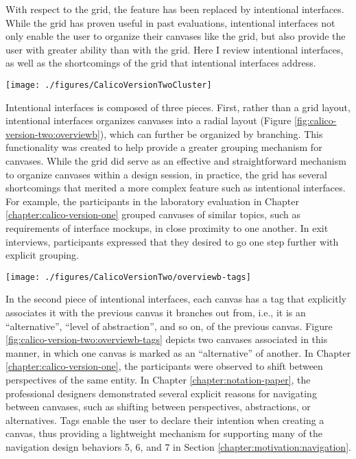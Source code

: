 \documentclass[12pt,fleqn]{ucithesis}
\begin{document}
With respect to the grid, the feature has been replaced by intentional interfaces. While the grid has proven useful in past evaluations, intentional interfaces not only enable the user to organize their canvases like the grid, but also provide the user with greater ability than with the grid. Here I review intentional interfaces, as well as the shortcomings of the grid that intentional interfaces address. 

\begin{figure*}[tbh]
  \centering
  \texttt{[image: ./figures/CalicoVersionTwoCluster]}
  \caption{Intentional Interfaces - Intention View.}
  \label{fig:calico-version-two:overviewb}
\end{figure*}

Intentional interfaces is composed of three pieces. First, rather than a grid layout, intentional interfaces organizes canvases into a radial layout (Figure \ref{fig:calico-version-two:overviewb}), which can further be organized by branching. This functionality was created to help provide a greater grouping mechanism for canvases. While the grid did serve as an effective and straightforward mechanism to organize canvases within a design session, in practice, the grid has several shortcomings that merited a more complex feature such as intentional interfaces. For example, the participants in the laboratory evaluation in Chapter \ref{chapter:calico-version-one} grouped canvases of similar topics, such as requirements of interface mockups, in close proximity to one another. In exit interviews, participants expressed that they desired to go one step further with explicit grouping. 

\begin{figure*}[tbh]
  \centering
  \texttt{[image: ./figures/CalicoVersionTwo/overviewb-tags]}
  \caption{Canvases are related to one another within intentional interfaces using tags.}
  \label{fig:calico-version-two:overviewb-tags}
\end{figure*}

In the second piece of intentional interfaces, each canvas has a tag that explicitly associates it with the previous canvas it branches out from, i.e., it is an ``alternative'', ``level of abstraction'', and so on, of the previous canvas. Figure \ref{fig:calico-version-two:overviewb-tags} depicts two canvases associated in this manner, in which one canvas is marked as an ``alternative'' of another. In Chapter \ref{chapter:calico-version-one}, the participants were observed to shift between perspectives of the same entity. In Chapter \ref{chapter:notation-paper}, the professional designers demonstrated several explicit reasons for navigating between canvases, such as shifting between perspectives, abstractions, or alternatives. Tags enable the user to declare their intention when creating a canvas, thus providing a lightweight mechanism for supporting many of the navigation design behaviors 5, 6, and 7 in Section \ref{chapter:motivation:navigation}. 
\end{document}
